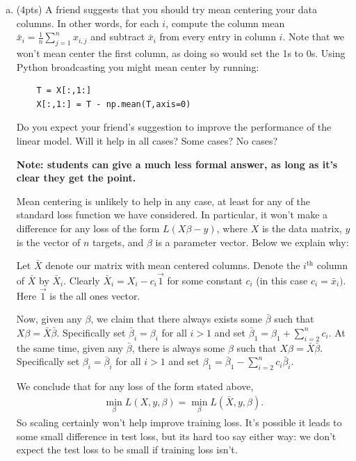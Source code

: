 \documentclass[10pt]{article}
\begin{document}
\begin{enumerate}[(a)]
	\item (4pts) A friend suggests that you should try mean centering your data columns. In other words, for each $i$, compute the column mean $\bar{x}_i = \frac{1}{n}\sum_{j=1}^n x_{i,j}$ and subtract $\bar{x}_i$ from every entry in column $i$. Note that we won't mean center the first column, as doing so would set the 1s to 0s.
	Using Python broadcasting you might mean center by running:
	\begin{lstlisting}
	T = X[:,1:]
	X[:,1:] = T - np.mean(T,axis=0)
	\end{lstlisting}
	Do you expect your friend's suggestion to improve the performance of the linear model. Will it help in all cases? Some cases? No cases?
	
	\color{blue}
	\textbf{Note: students can give a much less formal answer, as long as it's clear they get the point.}
	
	Mean centering is unlikely to help in any case, at least for any of the standard loss function we have considered. In particular, it won't make a difference for any loss of the form $L(X\beta - y)$, where $X$ is the data matrix, $y$ is the vector of $n$ targets, and $\beta$ is a parameter vector.  Below we explain why:
	
	Let $\bar{X}$ denote our matrix with mean centered columns. Denote the $i^\text{th}$ column of $\bar{X}$ by $\bar{X}_i$. Clearly $\bar{X}_i = X_i - c_i \vec{1}$ for some constant $c_i$ (in this case $c_i = \bar{x}_i)$. Here $\vec{1}$ is the all ones vector. 
	
	Now, given any $\beta$, we claim that there always exists some $\bar{\beta}$ such that $X\beta = \bar{X}\bar{\beta}$. Specifically set $\bar{\beta}_i = {\beta}_i$ for all $i > 1$ and set $\bar{\beta}_1 = \beta_1 + \sum_{i=2}^n c_i$. At the same time, given any  $\bar{\beta}$, there is always some $\beta$ such that $X\beta = \bar{X}\bar{\beta}$. Specifically set ${\beta}_i = \bar{\beta}_i$ for all $i > 1$ and set ${\beta}_1 = \bar{\beta}_1 - \sum_{i=2}^n c_i\bar{\beta}_i$.
	
	We conclude that for any loss of the form stated above, 
	\begin{align*}
	\min_\beta L(X,y,\beta) = 	\min_\beta L(\bar{X},y,\beta).
	\end{align*}
	So scaling certainly won't help improve training loss. It's possible it leads to some small difference in test loss, but its hard too say either way: we don't expect the test loss to be small if training loss isn't. 
	\color{black}
	

\end{enumerate}
\end{document}

